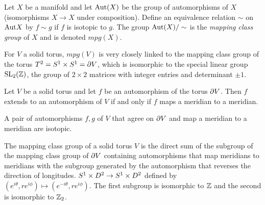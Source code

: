 \begin{defn}
	Let $X$ be a manifold and let $\textrm{Aut} (X)$ be the group of automorphisms of $X$ (isomorphisms $X\to X$ under composition).
	Define an equivalence relation $\sim$ on $\textrm{Aut} X$ by $f\sim g$ if $f$ is isotopic to $g$.
	The group $\textrm{Aut}(X)/\sim$ is the \emph{mapping class group} of $X$ and is denoted $mpg(X)$.
\end{defn}

For $V$ a solid torus, $mpg(V)$ is very closely linked to the mapping class group of the torus $T^2 = S^1\times S^1=\partial V$, which is isomorphic to the special linear group $\textrm{SL}_2(\mathbb{Z})$, the group of $2\times 2$ matrices with integer entries and determinant $\pm 1$.
\begin{lem}
	Let $V$ be a solid torus and let $f$ be an automorphism of the torus $\partial V$.
	Then $f$ extends to an automorphism of $V$ if and only if $f$ maps a meridian to a meridian.	
\end{lem}

\begin{lem}
	A pair of automorphisms $f,g$ of $V$ that agree on $\partial V$ and map a meridian to a meridian are isotopic.	
\end{lem}

\begin{theorem}
	\label{thm:mpgV}
	The mapping class group of a solid torus $V$ is the direct sum of the subgroup of the mapping class group of $\partial V$ containing automorphisms that map meridians to meridians with the subgroup generated by the automorphism that reverses the direction of longitudes.
	$S^1\times D^2\to S^1\times D^2$ defined by $(e^{i\theta},re^{i\phi})\mapsto(e^{-i\theta},re^{i\phi})$.
	The first subgroup is isomorphic to $\mathbb{Z}$ and the second is isomorphic to $\mathbb{Z}_2$.	
\end{theorem}

